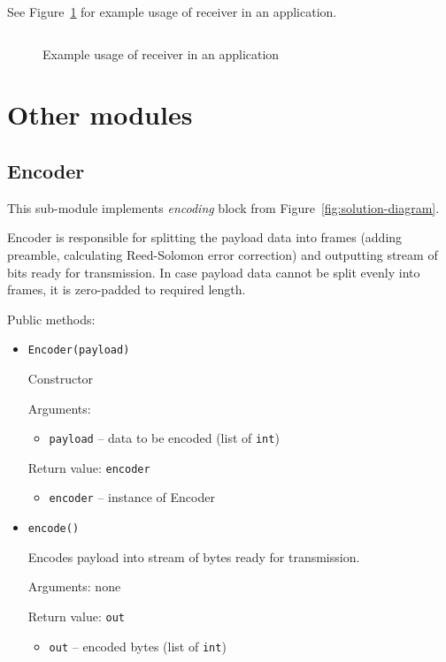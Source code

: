 \documentclass[english,bachelor,a4paper,oneside]{ppfcmthesis}
\begin{document}
See Figure~\ref{fig:receiver-application} for example usage of receiver in an application.

\clearpage

\begin{figure}[h]
\centering
\inputminted[linenos]{python}{listings/receiver_example.py}
\caption{Example usage of receiver in an application}
\label{fig:receiver-application}
\end{figure}

\section{Other modules}

\subsection{Encoder}

This sub-module implements \emph{encoding} block from Figure~\ref{fig:solution-diagram}.

Encoder is responsible for splitting the payload data into frames (adding preamble, calculating Reed-Solomon error correction) and outputting stream of bits ready for transmission. In case payload data cannot be split evenly into frames, it is zero-padded to required length.

Public methods:

\begin{itemize}
\item \verb|Encoder(payload)|

  Constructor

  Arguments:
  \begin{itemize}
  \item \verb|payload| -- data to be encoded (list of \verb|int|)
  \end{itemize}

  Return value: \verb|encoder|
  \begin{itemize}
  \item \verb|encoder| -- instance of Encoder
  \end{itemize}

\item \verb|encode()|

  Encodes payload into stream of bytes ready for transmission.

  Arguments: none

  Return value: \verb|out|
  \begin{itemize}
  \item \verb|out| -- encoded bytes (list of \verb|int|)
  \end{itemize}

\end{itemize}
\end{document}
